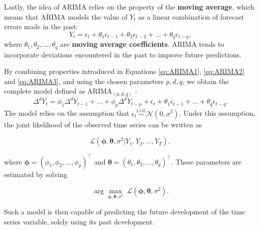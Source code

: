 Lastly, the idea of ARIMA relies on the property of the \textbf{moving average}, which means that ARIMA models
the value of $Y_t$ as a linear combination of forecast errors made in the past:
\begin{equation}
    \label{eq:ARIMA3}
    Y_t = \epsilon_t + \theta_1 \epsilon_{t-1} + \theta_2 \epsilon_{t-2} + \ldots + \theta_q \epsilon_{t-q},
\end{equation}
where $\theta_1, \theta_2, \ldots, \theta_q$ are \textbf{moving average coefficients}. ARIMA tends to incorporate deviations encountered in the past to improve future predictions.

By combining properties introduced in Equations \eqref{eq:ARIMA1}, \eqref{eq:ARIMA2} and \eqref{eq:ARIMA3}, and using the
chosen parameters $p, d, q$, we obtain the complete model defined as ARIMA$_{(p, d, q)}$ \cite{forecast_book}:
\begin{equation}
    \Delta^d Y_t = \phi_1 \Delta^d Y_{t-1} + \ldots + \phi_p \Delta^d Y_{t-p} + \epsilon_t + \theta_1 \epsilon_{t-1} + \ldots + \theta_q \epsilon_{t-q}.
\end{equation}
The model relies on the assumption that $\epsilon_t \stackrel{\text{i.i.d.}}{\sim} \mathcal{N}(0, \sigma^2)$. Under this assumption, 
the joint likelihood of the observed time series can be written as

\begin{equation}
    \label{MLE}
    \mathcal{L}(\bm{\phi}, \bm{\theta}, \sigma^2 | Y_1, Y_2, \ldots, Y_T),
\end{equation}

where $\bm{\phi}=(\phi_1, \phi_2, \ldots, \phi_p)^\top$ and $\bm{\theta}=(\theta_1, \theta_2, \ldots, \theta_q)^\top$. These parameters are estimated by solving 

\begin{equation*}
    \arg \max_{\bm{\phi}, \bm{\theta}, \sigma^2} \> \mathcal{L}(\bm{\phi}, \bm{\theta}, \sigma^2).
\end{equation*}

Such a model is then capable of predicting the future development of the time series variable, solely using its past development.